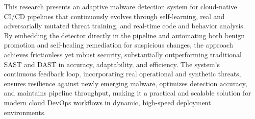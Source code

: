 This research presents an adaptive malware detection system for cloud-native CI/CD pipelines that continuously evolves through self-learning, real and adversarially mutated threat training, and real-time code and behavior analysis. By embedding the detector directly in the pipeline and automating both benign promotion and self-healing remediation for suspicious changes, the approach achieves frictionless yet robust security, substantially outperforming traditional SAST and DAST in accuracy, adaptability, and efficiency. The system’s continuous feedback loop, incorporating real operational and synthetic threats, ensures resilience against newly emerging malware, optimizes detection accuracy, and maintains pipeline throughput, making it a practical and scalable solution for modern cloud DevOps workflows in dynamic, high-speed deployment environments.
